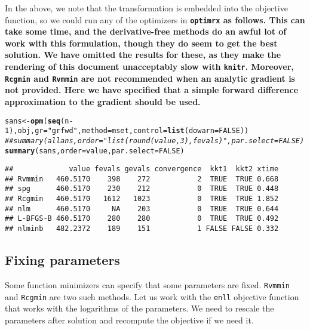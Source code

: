 \documentclass[11pt]{article}\usepackage[]{graphicx}\usepackage[]{color}
\makeatletter
\newcommand{\hlnum}[1]{\textcolor[rgb]{0.686,0.059,0.569}{#1}}%
\newcommand{\hlstr}[1]{\textcolor[rgb]{0.192,0.494,0.8}{#1}}%
\newcommand{\hlcom}[1]{\textcolor[rgb]{0.678,0.584,0.686}{\textit{#1}}}%
\newcommand{\hlopt}[1]{\textcolor[rgb]{0,0,0}{#1}}%
\newcommand{\hlstd}[1]{\textcolor[rgb]{0.345,0.345,0.345}{#1}}%
\newcommand{\hlkwb}[1]{\textcolor[rgb]{0.69,0.353,0.396}{#1}}%
\newcommand{\hlkwc}[1]{\textcolor[rgb]{0.333,0.667,0.333}{#1}}%
\newcommand{\hlkwd}[1]{\textcolor[rgb]{0.737,0.353,0.396}{\textbf{#1}}}%
\newenvironment{kframe}{%
 \def\at@end@of@kframe{}%
 \ifinner\ifhmode%
  \def\at@end@of@kframe{\end{minipage}}%
  \begin{minipage}{\columnwidth}%
 \fi\fi%
 \def\FrameCommand##1{\hskip\@totalleftmargin \hskip-\fboxsep
 \colorbox{shadecolor}{##1}\hskip-\fboxsep
     \hskip-\linewidth \hskip-\@totalleftmargin \hskip\columnwidth}%
 \MakeFramed {\advance\hsize-\width
   \@totalleftmargin\z@ \linewidth\hsize
   \@setminipage}}%
 {\par\unskip\endMakeFramed%
 \at@end@of@kframe}
\newenvironment{knitrout}{}{} %
\newcommand{\code}[1]{{\tt#1}}
\newcommand{\pkg}[1]{\bf{\tt#1}\rm }
\makeatother
\begin{document}
In the above, we note that the transformation is embedded into the objective function, 
so we could run any of the optimizers in \pkg{optimrx} as follows. This can take some time, 
and the derivative-free
methods do an awful lot of work with this formulation, though they do seem to get the
best solution. We have omitted the results for these, as they make the rendering of
this document unacceptably slow with \code{knitr}. Moreover, \code{Rcgmin}
and \code{Rvmmin} are not recommended when an analytic gradient is not provided. Here
we have specified that a simple forward difference approximation to the gradient
should be used. 

\begin{knitrout}\scriptsize
{}\color{fgcolor}\begin{kframe}
\begin{alltt}
\hlstd{sans}\hlkwb{<-} \hlkwd{opm}\hlstd{(}\hlkwd{seq}\hlstd{(n}\hlopt{-}\hlnum{1}\hlstd{), obj,} \hlkwc{gr}\hlstd{=}\hlstr{"grfwd"}\hlstd{,} \hlkwc{method}\hlstd{=mset,} \hlkwc{control}\hlstd{=}\hlkwd{list}\hlstd{(}\hlkwc{dowarn}\hlstd{=}\hlnum{FALSE}\hlstd{))}
\hlcom{## summary(allans, order = "list(round(value, 3), fevals)", par.select = FALSE)}
\hlkwd{summary}\hlstd{(sans,} \hlkwc{order} \hlstd{= value,} \hlkwc{par.select} \hlstd{=} \hlnum{FALSE}\hlstd{)}
\end{alltt}
\begin{verbatim}
##             value fevals gevals convergence  kkt1  kkt2 xtime
## Rvmmin   460.5170    398    272           2  TRUE  TRUE 0.668
## spg      460.5170    230    212           0  TRUE  TRUE 0.448
## Rcgmin   460.5170   1612   1023           0  TRUE  TRUE 1.852
## nlm      460.5170     NA    203           0  TRUE  TRUE 0.644
## L-BFGS-B 460.5170    280    280           0  TRUE  TRUE 0.492
## nlminb   482.2372    189    151           1 FALSE FALSE 0.332
\end{verbatim}
\end{kframe}
\end{knitrout}

\subsection{Fixing parameters}

Some function minimizers can specify that some parameters are fixed. \code{Rvmmin} and
\code{Rcgmin} are two such methods. Let us work with the \code{enll} objective function
that works with the logarithms of the parameters.
We need to rescale the parameters after solution and recompute the objective if we need it.
\end{document}
